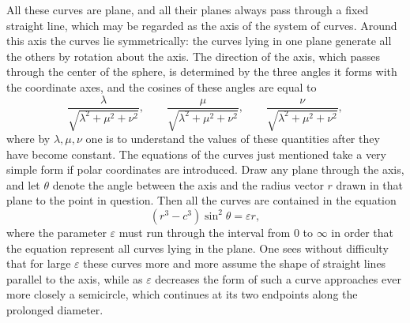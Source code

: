 \documentclass[11pt]{article}
\begin{document}
All these curves are plane, and all their planes always pass through a fixed straight line, which may be regarded as the axis of the system of curves. Around this axis the curves lie symmetrically: the curves lying in one plane generate all the others by rotation about the axis. The direction of the axis, which passes through the center of the sphere, is determined by the three angles it forms with the coordinate axes, and the cosines of these angles are equal to
\[
 \frac{\lambda}{\sqrt{\lambda^2+\mu^2+\nu^2}},\qquad
 \frac{\mu}{\sqrt{\lambda^2+\mu^2+\nu^2}},\qquad
 \frac{\nu}{\sqrt{\lambda^2+\mu^2+\nu^2}},
\]
where by $\lambda,\mu,\nu$ one is to understand the values of these quantities after they have become constant. The equations of the curves just mentioned take a very simple form if polar coordinates are introduced. Draw any plane through the axis, and let $\theta$ denote the angle between the axis and the radius vector $r$ drawn in that plane to the point in question. Then all the curves are contained in the equation
\[
 (r^3-c^3)\sin^2\theta=\varepsilon r,
\]
where the parameter $\varepsilon$ must run through the interval from $0$ to $\infty$ in order that the equation represent all curves lying in the plane. One sees without difficulty that for large $\varepsilon$ these curves more and more assume the shape of straight lines parallel to the axis, while as $\varepsilon$ decreases the form of such a curve approaches ever more closely a semicircle, which continues at its two endpoints along the prolonged diameter.
\end{document}
